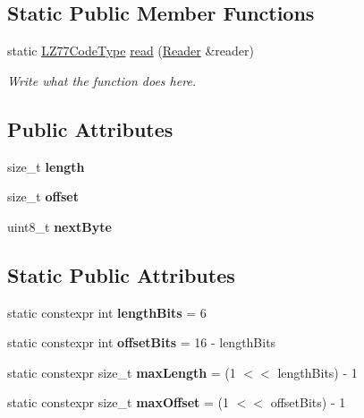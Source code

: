 \subsection*{Static Public Member Functions}
\begin{DoxyCompactItemize}
\item 
static \hyperlink{structLZ77CodeType}{L\+Z77\+Code\+Type} \hyperlink{structLZ77CodeType_a81a3dc5f81b7ab0f7fc8ddfe80dca56f}{read} (\hyperlink{classReader}{Reader} \&reader)
\begin{DoxyCompactList}\small\item\em Write what the function does here. \end{DoxyCompactList}\end{DoxyCompactItemize}
\subsection*{Public Attributes}
\begin{DoxyCompactItemize}
\item 
\hypertarget{structLZ77CodeType_a1293f16ab8da36535682268031ec12a2}{size\+\_\+t {\bfseries length}}\label{structLZ77CodeType_a1293f16ab8da36535682268031ec12a2}

\item 
\hypertarget{structLZ77CodeType_a99e75c41fc2a5d36496e2eb6c675e8ce}{size\+\_\+t {\bfseries offset}}\label{structLZ77CodeType_a99e75c41fc2a5d36496e2eb6c675e8ce}

\item 
\hypertarget{structLZ77CodeType_ad5e0d80546417194466ff5300d0abc6f}{uint8\+\_\+t {\bfseries next\+Byte}}\label{structLZ77CodeType_ad5e0d80546417194466ff5300d0abc6f}

\end{DoxyCompactItemize}
\subsection*{Static Public Attributes}
\begin{DoxyCompactItemize}
\item 
\hypertarget{structLZ77CodeType_af6ddc790f261e742edf7e4c9730f2428}{static constexpr int {\bfseries length\+Bits} = 6}\label{structLZ77CodeType_af6ddc790f261e742edf7e4c9730f2428}

\item 
\hypertarget{structLZ77CodeType_a73491cf97e707f632e18d331d88c9aec}{static constexpr int {\bfseries offset\+Bits} = 16 -\/ length\+Bits}\label{structLZ77CodeType_a73491cf97e707f632e18d331d88c9aec}

\item 
\hypertarget{structLZ77CodeType_a91907290a8a919c21b5312ece5fe5eb4}{static constexpr size\+\_\+t {\bfseries max\+Length} = (1 $<$$<$ length\+Bits) -\/ 1}\label{structLZ77CodeType_a91907290a8a919c21b5312ece5fe5eb4}

\item 
\hypertarget{structLZ77CodeType_a07cb40a10cc2f689a9323c0f6533ed3c}{static constexpr size\+\_\+t {\bfseries max\+Offset} = (1 $<$$<$ offset\+Bits) -\/ 1}\label{structLZ77CodeType_a07cb40a10cc2f689a9323c0f6533ed3c}

\end{DoxyCompactItemize}


